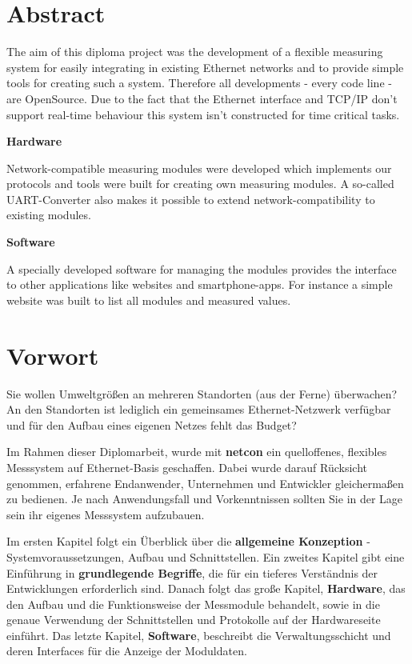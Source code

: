 \documentclass[a4paper,14pt,headsepline]{scrartcl}
\begin{document}
\section*{Abstract}
The aim of this diploma project was the development of a flexible measuring system for easily integrating in existing Ethernet networks and to provide simple tools for creating such a system. Therefore all developments - every code line - are OpenSource. Due to the fact that the Ethernet interface and TCP/IP don't support real-time behaviour this system isn't constructed for time critical tasks. 

\textbf{Hardware}

Network-compatible measuring modules were developed which implements our protocols and tools were built for creating own measuring modules. A so-called UART-Converter also makes it possible to extend network-compatibility to existing modules. 

\textbf{Software}

A specially developed software for managing the modules provides the interface to other applications like websites and smartphone-apps. For instance a simple website was built to list all modules and measured values.


\newpage

\section*{Vorwort}
Sie wollen Umweltgrößen an mehreren Standorten (aus der Ferne) überwachen? An den Standorten ist lediglich ein gemeinsames Ethernet-Netzwerk verfügbar und für den Aufbau eines eigenen Netzes fehlt das Budget?

Im Rahmen dieser Diplomarbeit, wurde mit \textbf{netcon} ein quelloffenes, flexibles Messsystem auf Ethernet-Basis geschaffen. Dabei wurde darauf Rücksicht genommen, erfahrene Endanwender, Unternehmen und Entwickler gleichermaßen zu bedienen. Je nach Anwendungsfall und Vorkenntnissen sollten Sie in der Lage sein ihr eigenes Messsystem aufzubauen. 

Im ersten Kapitel folgt ein Überblick über die \textbf{allgemeine Konzeption} - Systemvoraussetzungen, Aufbau und Schnittstellen. Ein zweites Kapitel gibt eine Einführung in \textbf{grundlegende Begriffe}, die für ein tieferes Verständnis der Entwicklungen erforderlich sind. Danach folgt das große Kapitel, \textbf{Hardware}, das den Aufbau und die Funktionsweise der Messmodule behandelt, sowie in die genaue Verwendung der Schnittstellen und Protokolle auf der Hardwareseite einführt. Das letzte Kapitel, \textbf{Software}, beschreibt die Verwaltungsschicht und deren Interfaces für die Anzeige der Moduldaten.
\end{document}
